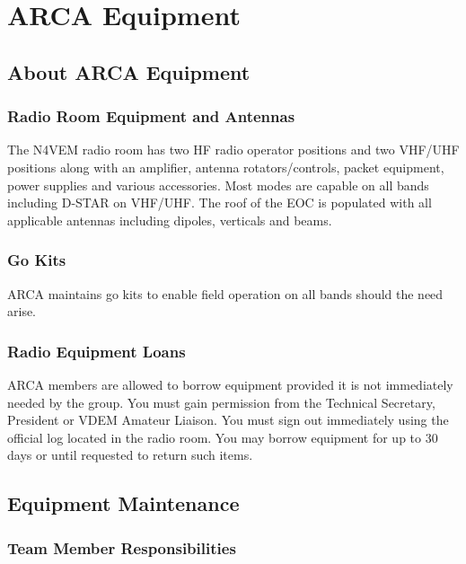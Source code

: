 \documentclass[pdflatex,letterpaper,twoside,12pt]{book}
\begin{document}
\chapter{ARCA Equipment}

\section{About ARCA Equipment}

\subsection{Radio Room Equipment and Antennas}

The N4VEM radio room has two HF radio operator positions and two VHF/UHF positions along with an amplifier, antenna rotators/controls, packet equipment, power supplies and various accessories. Most modes are capable on all bands including D-STAR on VHF/UHF.  The roof of the EOC is populated with all applicable antennas including dipoles, verticals and beams.

\subsection{Go Kits}

ARCA maintains go kits to enable field operation on all bands should the need arise.

\subsection{Radio Equipment Loans}

ARCA members are allowed to borrow equipment provided it is not immediately needed by the group. You must gain permission from the Technical Secretary, President or VDEM Amateur Liaison.  You must sign out immediately using the official log located in the radio room. You may borrow equipment for up to 30 days or until requested to return such items.


\section{Equipment Maintenance}

\subsection{Team Member Responsibilities}
\end{document}
